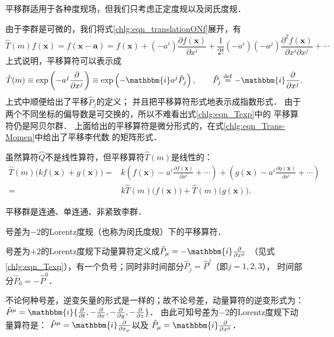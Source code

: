 平移群适用于各种度规场，但我们只考虑正定度规以及闵氏度规．

由于李群是可微的，我们将式\eqref{chlg:eqn_translationONf}展开，有
\begin{equation*}
    \hat{T}(m) f(\boldsymbol{x}) = f(\boldsymbol{x} - \boldsymbol{a}) 
    = f(\boldsymbol{x}) + (-a^i) \frac{\partial f(\boldsymbol{x})}{\partial x^i}
    +\frac{1}{2!} (-a^i)(-a^j) \frac{\partial^2 f(\boldsymbol{x})}{\partial x^i \partial x^j}
    +\cdots 
\end{equation*}
上式说明，平移算符可以表示成
\begin{equation}\label{chlg:eqn_Texp}
    \hat{T}(m) \equiv \exp\left( -a^j \frac{\partial }{\partial x^j} \right) 
    \equiv\exp\left(-\mathbbm{i} a^j \hat{P}_j  \right) , \qquad
    \hat{P}_j\overset{\mathrm {def}}{=} -\mathbbm{i}\frac{\partial }{\partial x^j} .
\end{equation}
上式中顺便给出了平移$\hat{P}_j$的定义；
并且把平移算符形式地表示成指数形式．
由于两个不同坐标的偏导数是可交换的，所以不难看出式\eqref{chlg:eqn_Texp}中的
平移算符仍是阿贝尔群．
上面给出的平移算符是微分形式的，在式\eqref{chlg:eqn_Trans-Momen}中给出了平移李代数
的矩阵形式．

虽然算符$\hat{Q}$不是线性算符，但平移算符$\hat{T}(m)$是线性的：
\begin{align*}
    \hat{T}(m) \bigl(k f(\boldsymbol{x})+g(\boldsymbol{x})\bigr) =&
    k\left( f(\boldsymbol{x}) - a^i \frac{\partial f(\boldsymbol{x})}{\partial x^i} +\cdots \right) 
    +\left(g(\boldsymbol{x}) - a^i \frac{\partial g(\boldsymbol{x})}{\partial x^i} +\cdots \right) \\
    =& k \hat{T}(m) \bigl(f(\boldsymbol{x})\bigr) + \hat{T}(m) \bigl(g(\boldsymbol{x})\bigr) .
\end{align*}

平移群是连通、单连通、非紧致李群．

\begin{example}\label{chlg:exam_pm2}
    号差为$-2$的Lorentz度规（也称为闵氏度规）下的平移算符．
\end{example}
号差为$+2$的Lorentz度规下动量算符定义成$\hat{P}_\mu =- \mathbbm{i}\frac{\partial }{\partial x^\mu}$
（见式\eqref{chlg:eqn_Texp}），有一个负号；同时非时间部分$\hat{P}_j =\hat{P}^j$（即$j=1,2,3$），
时间部分$\hat{P}_0 =-\hat{P}^0$．

不论何种号差，逆变矢量的形式是一样的；故不论号差，动量算符的逆变形式为：
$\hat{P}^\mu=\mathbbm{i}\{\frac{\partial}{\partial t}, -\frac{\partial}{\partial x},
-\frac{\partial}{\partial y},-\frac{\partial}{\partial z}\}$．
由此可知号差为$-2$的Lorentz度规下动量算符是：
$\hat{P}^\mu = \mathbbm{i}\frac{\partial }{\partial x_\mu}$以及
$\hat{P}_\mu = \mathbbm{i}\frac{\partial }{\partial x^\mu}$．

